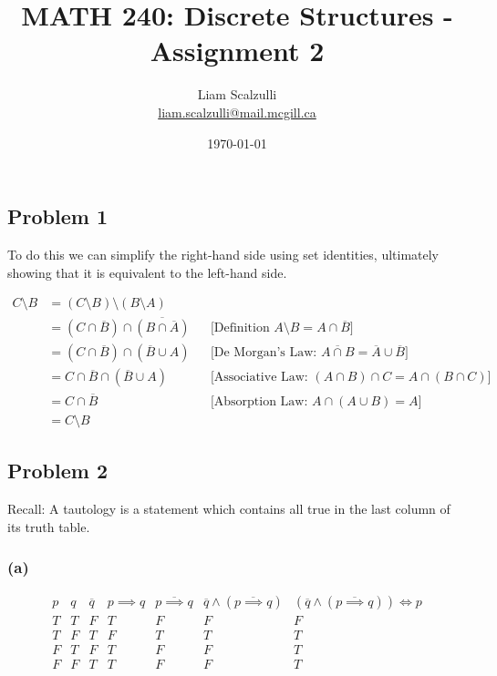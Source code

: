 \documentclass[10pt]{article}
\title{MATH 240: Discrete Structures - Assignment 2}
\author{Liam Scalzulli\\
\href{mailto:liam.scalzulli@mail.mcgill.ca}{liam.scalzulli@mail.mcgill.ca}}
\date{\today}
\begin{document}
\maketitle

\subsection*{Problem 1}

To do this we can simplify the right-hand side using set identities,
ultimately showing that it is equivalent to the left-hand side.

\begin{align*}
  C \setminus B &= (C \setminus B) \setminus (B \setminus A) \\
    &= (C \cap \overline{B}) \cap \overline{(B \cap \overline{A})}
      && \text{[Definition } A \setminus B = A \cap \overline{B}] \\
    &= (C \cap \overline{B}) \cap (\overline{B} \cup A) && \text{[De Morgan's
      Law: } \overline{A \cap B} = \overline{A} \cup \overline{B}] \\
    &= C \cap \overline{B} \cap (\overline{B} \cup A) && \text{[Associative Law: }
      (A \cap B) \cap C = A \cap (B \cap C)]\\
    &= C \cap \overline{B} && \text{[Absorption Law: } A \cap (A \cup B) = A] \\
    &= C \setminus B
\end{align*}

\subsection*{Problem 2}

Recall: A tautology is a statement which contains all true in the last column
of its truth table.

\subsubsection*{(a)}

\begin{displaymath}
  \begin{array}{c|c|c|c|c|c|c}
    p & q & \overline{q} & p \implies q & \overline{p \implies q} & \overline{q}
    \land (\overline{p \implies q}) & (\overline{q} \land (\overline{p \implies
    q})) \iff p \\
    \hline
    T & T & F & T & F & F & F \\
    T & F & T & F & T & T & T \\
    F & T & F & T & F & F & T \\
    F & F & T & T & F & F & T \\
  \end{array}
\end{displaymath}
\end{document}
